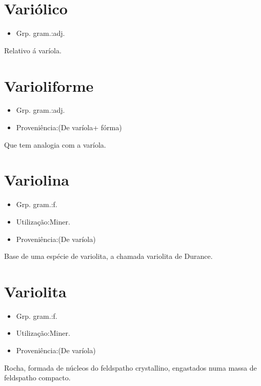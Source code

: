\documentclass{article}
\begin{document}
\section{Variólico}
\begin{itemize}
\item {Grp. gram.:adj.}
\end{itemize}
Relativo á varíola.
\section{Varioliforme}
\begin{itemize}
\item {Grp. gram.:adj.}
\end{itemize}
\begin{itemize}
\item {Proveniência:(De \textunderscore varíola\textunderscore  + \textunderscore fórma\textunderscore )}
\end{itemize}
Que tem analogia com a varíola.
\section{Variolina}
\begin{itemize}
\item {Grp. gram.:f.}
\end{itemize}
\begin{itemize}
\item {Utilização:Miner.}
\end{itemize}
\begin{itemize}
\item {Proveniência:(De \textunderscore varíola\textunderscore )}
\end{itemize}
Base de uma espécie de variolita, a chamada variolita de Durance.
\section{Variolita}
\begin{itemize}
\item {Grp. gram.:f.}
\end{itemize}
\begin{itemize}
\item {Utilização:Miner.}
\end{itemize}
\begin{itemize}
\item {Proveniência:(De \textunderscore varíola\textunderscore )}
\end{itemize}
Rocha, formada de núcleos do feldspatho crystallino, engastados numa massa de feldspatho compacto.
\end{document}
